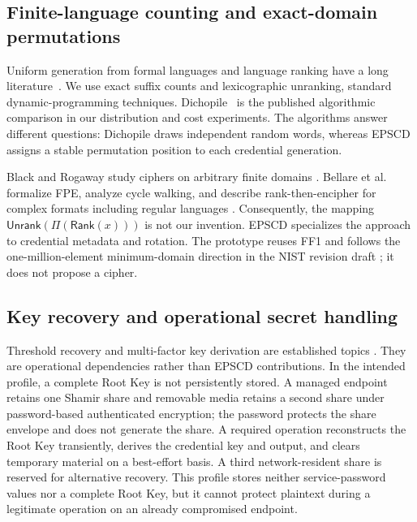 \documentclass[preprint,12pt]{elsarticle}
\newcommand{\Rank}{\mathsf{Rank}}
\newcommand{\Unrank}{\mathsf{Unrank}}
\newcommand{\Perm}{\Pi}
\begin{document}
\subsection{Finite-language counting and exact-domain permutations}

Uniform generation from formal languages and language ranking have a long
literature~\cite{hickey1983uniform,goldwurm1995random,denise1999uniform,
bernardi2012linear,oudinet2013uniform,goldberg1985ranking}. We use exact suffix
counts and lexicographic unranking, standard dynamic-programming techniques.
Dichopile~\cite{oudinet2013uniform} is the published algorithmic comparison in
our distribution and cost experiments. The algorithms answer different
questions: Dichopile draws independent random words, whereas EPSCD assigns a
stable permutation position to each credential generation.

Black and Rogaway study ciphers on arbitrary finite domains
\cite{black2002finite}. Bellare et al. formalize FPE, analyze cycle walking, and
describe rank-then-encipher for complex formats including regular languages
\cite{bellare2009fpe}. Consequently, the mapping
$\Unrank(\Perm(\Rank(x)))$ is not our invention. EPSCD specializes the approach
to credential metadata and rotation. The prototype reuses FF1 and follows the
one-million-element minimum-domain direction in the NIST revision draft
\cite{nist38g}; it does not propose a cipher.

\subsection{Key recovery and operational secret handling}

Threshold recovery and multi-factor key derivation are established topics
\cite{shamir1979share,nair2023mfkdf,scarlata2024mfkdf}. They are operational
dependencies rather than EPSCD contributions. In the intended profile, a
complete Root Key is not persistently stored. A managed endpoint retains one
Shamir share and removable media retains a second share under password-based
authenticated encryption; the password protects the share envelope and does
not generate the share. A required operation reconstructs the Root Key
transiently, derives the credential key and output, and clears temporary
material on a best-effort basis. A third network-resident share is reserved for
alternative recovery. This profile stores neither service-password values nor
a complete Root Key, but it cannot protect plaintext during a legitimate
operation on an already compromised endpoint.
\end{document}
